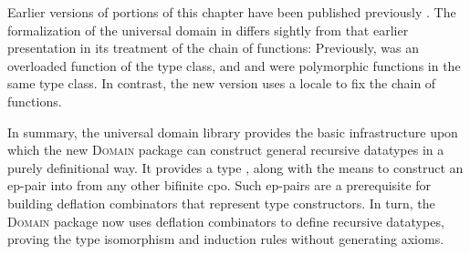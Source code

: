 Earlier versions of portions of this chapter have been published previously \cite{huffman09universal}. The formalization of the universal domain in  differs sightly from that earlier presentation in its treatment of the chain of  functions: Previously,  was an overloaded function of the  type class, and  and  were polymorphic functions in the same type class. In contrast, the new version uses a locale to fix the chain of  functions.

In summary, the  universal domain library provides the basic infrastructure upon which the new \textsc{Domain} package can construct general recursive datatypes in a purely definitional way. It provides a type , along with the means to construct an ep-pair into  from any other bifinite cpo. Such ep-pairs are a prerequisite for building deflation combinators that represent type constructors. In turn, the \textsc{Domain} package now uses deflation combinators to define recursive datatypes, proving the type isomorphism and induction rules without generating axioms.
